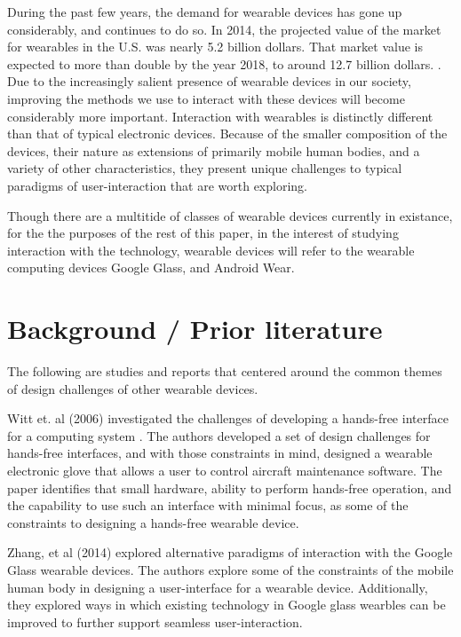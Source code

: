 \documentclass[12pt]{article}
\begin{document}
During the past few years, the demand for wearable devices has gone up considerably, and continues to do so. In 2014, the projected value of the market for wearables in the U.S. was nearly 5.2 billion dollars. That market value is expected to more than double by the year 2018, to around 12.7 billion dollars. \cite{wmv}. Due to the increasingly salient presence of wearable devices in our society, improving the methods we use to interact with these devices will become considerably more important. Interaction with wearables is distinctly different than that of typical electronic devices.  Because of the smaller composition of the devices, their nature as extensions of primarily mobile human bodies, and a variety of other characteristics, they present unique challenges to typical paradigms of user-interaction that are worth exploring.

Though there are a multitide of classes of wearable devices currently in existance, for the the purposes of the rest of this paper, in the interest of studying interaction with the technology, wearable devices will refer to the wearable computing devices Google Glass, and Android Wear.

\section{Background / Prior literature}

The following are studies and reports that centered around the common themes of design challenges of other wearable devices.

Witt et. al (2006) investigated the challenges of developing a hands-free interface for a computing system \cite{witt}. The authors developed a set of design challenges for hands-free interfaces, and with those constraints in mind, designed a wearable electronic glove that allows a user to control aircraft maintenance software. The paper identifies that small hardware, ability to perform hands-free operation, and the capability to use such an interface with minimal focus, as some of the constraints to designing a hands-free wearable device.

Zhang, et al (2014) explored alternative paradigms of interaction with the Google Glass wearable devices. The authors explore some of the constraints of the mobile human body in designing a user-interface for a wearable device. Additionally, they explored ways in which existing technology in Google glass wearbles can be improved to further support seamless user-interaction. 
\end{document}
